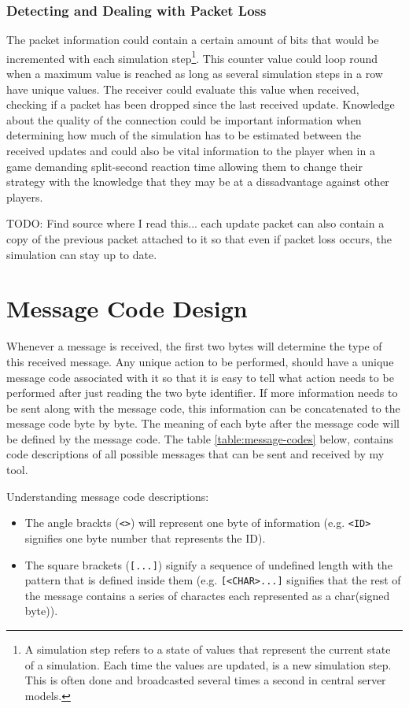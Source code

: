 \subsubsection{Detecting and Dealing with Packet Loss}
The packet information could contain a certain amount of bits that would be incremented with each simulation step\footnote{A simulation step refers to a state of values that represent the current state of a simulation. Each time the values are updated, is a new simulation step. This is often done and broadcasted several times a second in central server models.}. This counter value could loop round when a maximum value is reached as long as several simulation steps in a row have unique values. The receiver could evaluate this value when received, checking if a packet has been dropped since the last received update. Knowledge about the quality of the connection could be important information when determining how much of the simulation has to be estimated between the received updates and could also be vital information to the player when in a game demanding split-second reaction time allowing them to change their strategy with the knowledge that they may be at a dissadvantage against other players.

TODO: Find source where I read this...
each update packet can also contain a copy of the previous packet attached to it so that even if packet loss occurs, the simulation can stay up to date.

\newpage

\section{Message Code Design}
Whenever a message is received, the first two bytes will determine the type of this received message. Any unique action to be performed, should have a unique message code associated with it so that it is easy to tell what action needs to be performed after just reading the two byte identifier. If more information needs to be sent along with the message code, this information can be concatenated to the message code byte by byte. The meaning of each byte after the message code will be defined by the message code. The table \ref{table:message-codes} below, contains code descriptions of all possible messages that can be sent and received by my tool.

Understanding message code descriptions:
\begin{itemize}
\item The angle brackts (\lstinline{<>}) will represent one byte of information (e.g. \lstinline{<ID>} signifies one byte number that represents the ID).
\item The square brackets (\lstinline{[...]}) signify a sequence of undefined length with the pattern that is defined inside them (e.g. \lstinline{[<CHAR>...]} signifies that the rest of the message contains a series of charactes each represented as a char(signed byte)).
\end{itemize}
\vfill

